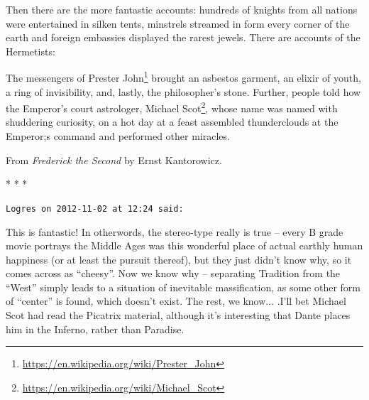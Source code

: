 Then there are the more fantastic accounts: hundreds of knights from all nations were entertained in silken tents, minstrels streamed in form every corner of the earth and foreign embassies displayed the rarest jewels. There are accounts of the Hermetists:

\begin{quotex}
The messengers of Prester John\footnote{\url{https://en.wikipedia.org/wiki/Prester\_John}} brought an asbestos garment, an elixir of youth, a ring of invisibility, and, lastly, the philosopher's stone. Further, people told how the Emperor's court astrologer, Michael Scot\footnote{\url{https://en.wikipedia.org/wiki/Michael\_Scot}}, whose name was named with shuddering curiosity, on a hot day at a feast assembled thunderclouds at the Emperor;s command and performed other miracles.
\end{quotex}

From \textit{Frederick the Second} by Ernst Kantorowicz.



\begin{center}* * *\end{center}

\begin{footnotesize}
\begin{sffamily}
\texttt{Logres on 2012-11-02 at 12:24 said:}

This is fantastic! In otherwords, the stereo-type really is true -- every B grade movie portrays the Middle Ages was this wonderful place of actual earthly human happiness (or at least the pursuit thereof), but they just didn't know why, so it comes across as ``cheesy''. Now we know why -- separating Tradition from the ``West'' simply leads to a situation of inevitable massification, as some other form of ``center'' is found, which doesn't exist. The rest, we know... .I'll bet Michael Scot had read the Picatrix material, although it's interesting that Dante places him in the Inferno, rather than Paradise.


\hfill

\end{sffamily}
\end{footnotesize}

